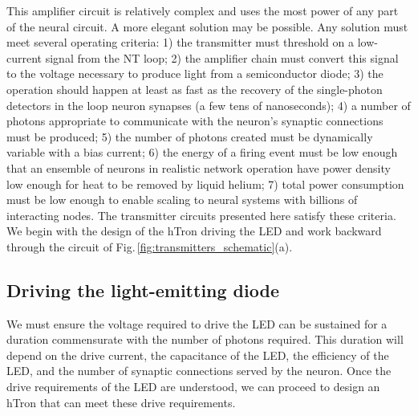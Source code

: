 \documentclass[twocolumn]{article}
\begin{document}
This amplifier circuit is relatively complex and uses the most power of any part of the neural circuit. A more elegant solution may be possible. Any solution must meet several operating criteria: 1) the transmitter must threshold on a low-current signal from the NT loop; 2) the amplifier chain must convert this signal to the voltage necessary to produce light from a semiconductor diode; 3) the operation should happen at least as fast as the recovery of the single-photon detectors in the loop neuron synapses (a few tens of nanoseconds); 4) a number of photons appropriate to communicate with the neuron's synaptic connections must be produced; 5) the number of photons created must be dynamically variable with a bias current; 6) the energy of a firing event must be low enough that an ensemble of neurons in realistic network operation have power density low enough for heat to be removed by liquid helium; 7) total power consumption must be low enough to enable scaling to neural systems with billions of interacting nodes. The transmitter circuits presented here satisfy these criteria. We begin with the design of the hTron driving the LED and work backward through the circuit of Fig.\,\ref{fig:transmitters_schematic}(a).
	
\subsection{\label{sec:LED}Driving the light-emitting diode}
We must ensure the voltage required to drive the LED can be sustained for a duration commensurate with the number of photons required. This duration will depend on the drive current, the capacitance of the LED, the efficiency of the LED, and the number of synaptic connections served by the neuron. Once the drive requirements of the LED are understood, we can proceed to design an hTron that can meet these drive requirements.
\end{document}
